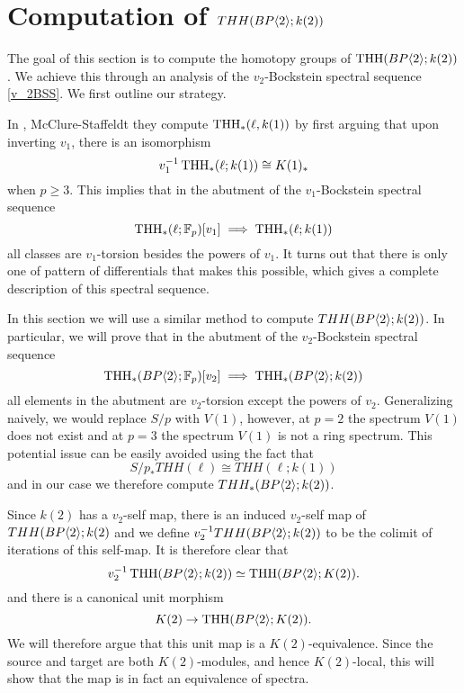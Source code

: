 
\section{Computation of $THH(BP\langle 2 \rangle;k(2))$}
The goal of this section is to compute the homotopy groups of $\operatorname{THH}(BP\langle 2 \rangle; k(2))$. We achieve this through an analysis of the $v_2$-Bockstein spectral sequence \eqref{v_2BSS}. We first outline our strategy. 

In \cites{McClureStaffeldt}, McClure-Staffeldt they compute $\operatorname{THH}_*(\ell, k(1))$ by first arguing that upon inverting $v_1$, there is an isomorphism
\begin{equation}\label{eqn:THH(ell;K(1))}
	v_1^{-1}\operatorname{THH}_*(\ell;k(1))\cong K(1)_*
\end{equation}
when $p\ge 3$.
This implies that in the abutment of the $v_1$-Bockstein spectral sequence
\[
\operatorname{THH}_*(\ell;\mathbb{F}_p)[v_1]\implies \operatorname{THH}_*(\ell;k(1))
\]
all classes are $v_1$-torsion besides the powers of $v_1$. It turns out that there is only one of pattern of differentials that makes this possible, which gives a complete description of this spectral sequence.

In this section we will use a similar method to compute $THH(BP\langle 2 \rangle;k(2))$. In particular, we will prove that in the abutment of the $v_2$-Bockstein spectral sequence 
\[
\operatorname{THH}_*(BP\langle 2 \rangle;\mathbb{F}_p)[v_2]\implies \operatorname{THH}_*(BP\langle 2 \rangle; k(2))
\]
all elements in the abutment are $v_2$-torsion except the powers of $v_2$. Generalizing naively, we would replace $S/p$ with $V(1)$, however, at $p=2$ the spectrum $V(1)$ does not exist and at $p=3$ the spectrum $V(1)$ is not a ring spectrum. This potential issue can be easily avoided using the fact that 
\[ S/p_*THH(\ell)\cong THH(\ell;k(1))\]
and in our case we therefore compute $THH_*(BP\langle 2 \rangle;k(2))$. 

Since $k(2)$ has a $v_2$-self map, there is an induced $v_2$-self map of $THH(BP\langle 2 \rangle;k(2)$ and we define 
$v_2^{-1}THH(BP\langle 2 \rangle;k(2))$
to be the colimit of iterations of this self-map. It is therefore clear that 
\[
v_2^{-1}\operatorname{THH}(BP\langle 2 \rangle;k(2))\simeq \operatorname{THH}(BP\langle 2 \rangle;K(2)). 
\]
and there is a canonical unit morphism 
\[
K(2)\to \operatorname{THH}(BP\langle 2 \rangle;K(2)). 
\]
We will therefore argue that this unit map is a $K(2)$-equivalence. Since the source and target are both $K(2)$-modules, and hence $K(2)$-local, this will show that the map is in fact an equivalence of spectra.

